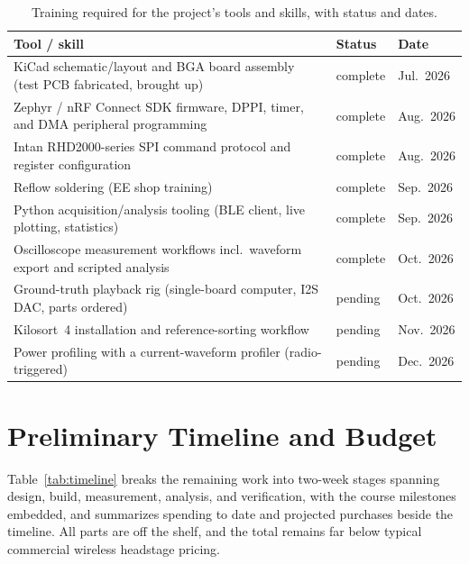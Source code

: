 \documentclass[11pt]{article}
\begin{document}
\begin{table}[H]
\centering
\caption{Training required for the project's tools and skills, with status and dates.}
\label{tab:training}
{\footnotesize\sffamily
\setlength{\tabcolsep}{4pt}
\renewcommand{\arraystretch}{1.2}
\begin{tabular}{|l|l|l|}
\hline
\textbf{Tool / skill} & \textbf{Status} & \textbf{Date} \\
\hline
KiCad schematic/layout and BGA board assembly (test PCB fabricated, brought up) & complete & Jul.\ 2026 \\
\hline
Zephyr / nRF Connect SDK firmware, DPPI, timer, and DMA peripheral programming & complete & Aug.\ 2026 \\
\hline
Intan RHD2000-series SPI command protocol and register configuration & complete & Aug.\ 2026 \\
\hline
Reflow soldering (EE shop training) & complete & Sep.\ 2026 \\
\hline
Python acquisition/analysis tooling (BLE client, live plotting, statistics) & complete & Sep.\ 2026 \\
\hline
Oscilloscope measurement workflows incl.\ waveform export and scripted analysis & complete & Oct.\ 2026 \\
\hline
Ground-truth playback rig (single-board computer, I2S DAC, parts ordered) & pending & Oct.\ 2026 \\
\hline
Kilosort~4 installation and reference-sorting workflow & pending & Nov.\ 2026 \\
\hline
Power profiling with a current-waveform profiler (radio-triggered) & pending & Dec.\ 2026 \\
\hline
\end{tabular}
}
\end{table}

\section{Preliminary Timeline and Budget}
Table~\ref{tab:timeline} breaks the remaining work into two-week stages spanning design,
build, measurement, analysis, and verification, with the course milestones embedded, and
summarizes spending to date and projected purchases beside the timeline. All parts are
off the shelf, and the total remains far below typical commercial wireless headstage
pricing.
\end{document}
